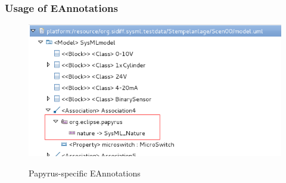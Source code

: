 \documentclass[10pt]{beamer}
\begin{document}
\begin{frame}
\frametitle{Usage of EAnnotations}
\begin{figure}%
\includegraphics[scale=0.4]{eannotations}\\
\caption{Papyrus-specific EAnnotations}
\end{figure}
\end{frame}
\end{document}
